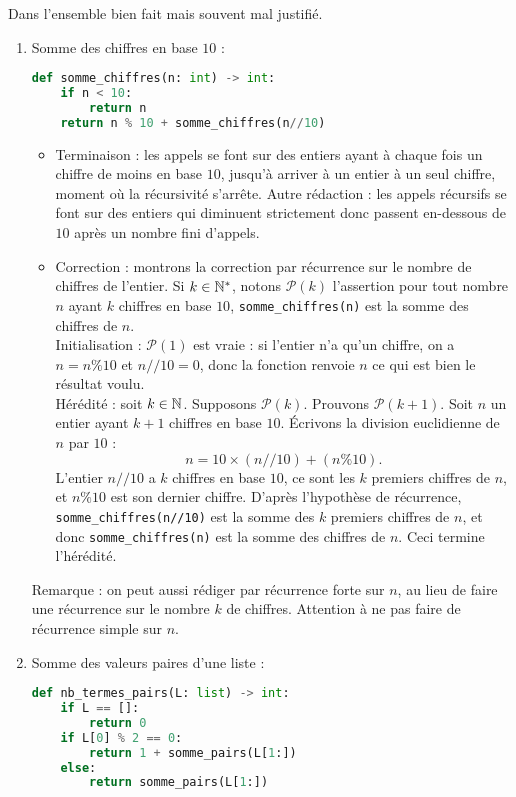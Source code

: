 \documentclass[11pt,a4paper]{article}
\begin{document}
Dans l'ensemble bien fait mais souvent mal justifié.
\begin{enumerate}
\item Somme des chiffres en base $10$ : 
\begin{lstlisting}[language=Python]
def somme_chiffres(n: int) -> int:
	if n < 10:
		return n
	return n % 10 + somme_chiffres(n//10)
\end{lstlisting}
\begin{itemize}
\item Terminaison : les appels se font sur des entiers ayant à chaque fois un chiffre de moins en base $10$, jusqu'à arriver à un entier à un seul chiffre, moment où la récursivité s'arrête. Autre rédaction : les appels récursifs se font sur des entiers qui diminuent strictement donc passent en-dessous de $10$ après un nombre fini d'appels.
\item Correction : montrons la correction par récurrence sur le nombre de chiffres de l'entier. Si $k\in \mathbb{N}^*$, notons $\mathcal P(k)$ l'assertion \og pour tout nombre $n$ ayant $k$ chiffres en base $10$, \verb+somme_chiffres(n)+ est la somme des chiffres de $n$.\fg\\
Initialisation : $\mathcal P(1)$ est vraie : si l'entier  n'a qu'un chiffre, on a $n = n \% 10$ et $n // 10 = 0$, donc la fonction renvoie $n$ ce qui est bien le résultat voulu.\\
Hérédité : soit $k\in \mathbb{N}$. Supposons $\mathcal P(k)$. Prouvons $\mathcal P(k+1)$. Soit $n$ un entier ayant $k+1$ chiffres en base $10$. Écrivons la division euclidienne de $n$ par $10$ :
\[  n  = 10 \times (n//10) + (n\% 10).\]
L'entier $n//10$ a $k$ chiffres en base $10$, ce sont les $k$ premiers chiffres de $n$, et $n\%10$ est son dernier chiffre. D'après l'hypothèse de récurrence, \verb+somme_chiffres(n//10)+ est la somme des $k$ premiers chiffres de $n$, et donc \verb+somme_chiffres(n)+ est la somme des chiffres de $n$. Ceci termine l'hérédité.
\end{itemize}
Remarque : on peut aussi rédiger par récurrence forte sur $n$, au lieu de faire une récurrence sur le nombre $k$ de chiffres. Attention à ne pas faire de récurrence simple sur $n$.
\item  Somme des valeurs paires d'une liste : 
\begin{lstlisting}[language=Python]
def nb_termes_pairs(L: list) -> int:
	if L == []:
		return 0
	if L[0] % 2 == 0:
		return 1 + somme_pairs(L[1:])
	else:
		return somme_pairs(L[1:])
\end{lstlisting}
\begin{itemize}

\end{itemize}
\end{enumerate}
\end{document}
